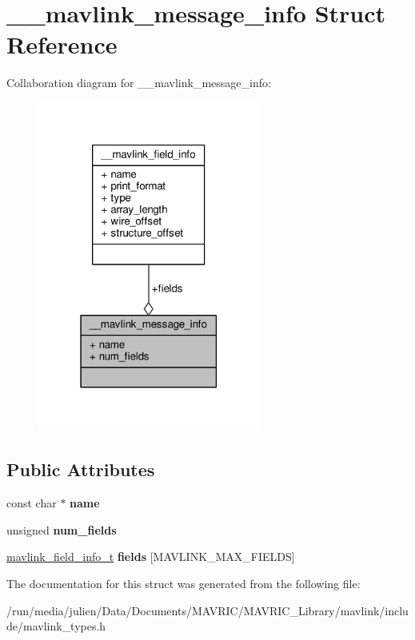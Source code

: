 \hypertarget{struct____mavlink__message__info}{\section{\+\_\+\+\_\+mavlink\+\_\+message\+\_\+info Struct Reference}
\label{struct____mavlink__message__info}
}


Collaboration diagram for \+\_\+\+\_\+mavlink\+\_\+message\+\_\+info\+:
\nopagebreak
\begin{figure}[H]
\begin{center}
\leavevmode
\includegraphics[width=207pt]{struct____mavlink__message__info__coll__graph}
\end{center}
\end{figure}
\subsection*{Public Attributes}
\begin{DoxyCompactItemize}
\item 
\hypertarget{struct____mavlink__message__info_a5e8b48c51cb8bc44bd844d1c3049ee32}{const char $\ast$ {\bfseries name}}\label{struct____mavlink__message__info_a5e8b48c51cb8bc44bd844d1c3049ee32}

\item 
\hypertarget{struct____mavlink__message__info_a0c343bcc1f27884e8c2ab875e7efc2e5}{unsigned {\bfseries num\+\_\+fields}}\label{struct____mavlink__message__info_a0c343bcc1f27884e8c2ab875e7efc2e5}

\item 
\hypertarget{struct____mavlink__message__info_a4a15f20958b43cb1282575c6da67a37b}{\hyperlink{struct____mavlink__field__info}{mavlink\+\_\+field\+\_\+info\+\_\+t} {\bfseries fields} \mbox{[}M\+A\+V\+L\+I\+N\+K\+\_\+\+M\+A\+X\+\_\+\+F\+I\+E\+L\+D\+S\mbox{]}}\label{struct____mavlink__message__info_a4a15f20958b43cb1282575c6da67a37b}

\end{DoxyCompactItemize}


The documentation for this struct was generated from the following file\+:\begin{DoxyCompactItemize}
\item 
/run/media/julien/\+Data/\+Documents/\+M\+A\+V\+R\+I\+C/\+M\+A\+V\+R\+I\+C\+\_\+\+Library/mavlink/include/mavlink\+\_\+types.\+h\end{DoxyCompactItemize}
